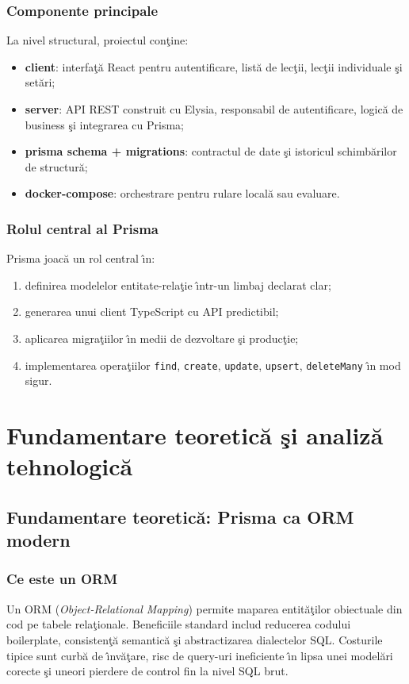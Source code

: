 \documentclass[12pt,onecolumn,draftclsnofoot]{IEEEtran}
\begin{document}
\subsubsection{Componente principale}
La nivel structural, proiectul con\c{t}ine:
\begin{itemize}
  \item \textbf{client}: interfa\c{t}\u{a} React pentru autentificare, list\u{a} de lec\c{t}ii, lec\c{t}ii individuale \c{s}i set\u{a}ri;
  \item \textbf{server}: API REST construit cu Elysia, responsabil de autentificare, logic\u{a} de business \c{s}i integrarea cu Prisma;
  \item \textbf{prisma schema + migrations}: contractul de date \c{s}i istoricul schimb\u{a}rilor de structur\u{a};
  \item \textbf{docker-compose}: orchestrare pentru rulare local\u{a} sau evaluare.
\end{itemize}

\subsubsection{Rolul central al Prisma}
Prisma joac\u{a} un rol central \^{\i}n:
\begin{enumerate}[label=\alph*)]
  \item definirea modelelor entitate-rela\c{t}ie \^{\i}ntr-un limbaj declarat clar;
  \item generarea unui client TypeScript cu API predictibil;
  \item aplicarea migra\c{t}iilor \^{\i}n medii de dezvoltare \c{s}i produc\c{t}ie;
  \item implementarea opera\c{t}iilor \texttt{find}, \texttt{create}, \texttt{update}, \texttt{upsert}, \texttt{deleteMany} \^{\i}n mod sigur.
\end{enumerate}

\section{Fundamentare teoretic\u{a} \c{s}i analiz\u{a} tehnologic\u{a}}

\subsection{Fundamentare teoretic\u{a}: Prisma ca ORM modern}
\subsubsection{Ce este un ORM}
Un ORM (\emph{Object-Relational Mapping}) permite maparea entit\u{a}\c{t}ilor obiectuale din cod pe tabele rela\c{t}ionale. Beneficiile standard includ reducerea codului boilerplate, consisten\c{t}\u{a} semantic\u{a} \c{s}i abstractizarea dialectelor SQL. Costurile tipice sunt curb\u{a} de \^{\i}nv\u{a}\c{t}are, risc de query-uri ineficiente \^{\i}n lipsa unei model\u{a}ri corecte \c{s}i uneori pierdere de control fin la nivel SQL brut.
\end{document}
